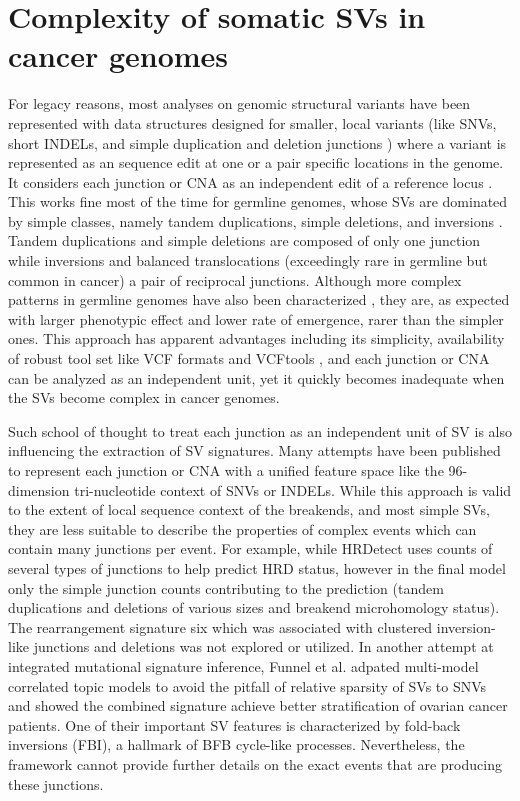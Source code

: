 \documentclass[phd,tocprelim]{cornell}
\begin{document}
\section{Complexity of somatic SVs in cancer genomes}
For legacy reasons, most analyses on genomic structural variants have been represented with data structures designed for smaller, local variants (like SNVs, short INDELs, and simple duplication and deletion junctions \cite{Danecek2011-yi}) where a variant is represented as an sequence edit at one or a pair specific locations in the genome. It considers each junction or CNA as an independent edit of a reference locus \cite{Li2008-su,Li2009-fv}. This works fine most of the time for germline genomes, whose SVs are dominated by simple classes, namely tandem duplications, simple deletions, and inversions \cite{Collins2020-iv}. Tandem duplications and simple deletions are composed of only one junction while inversions and balanced translocations (exceedingly rare in germline but common in cancer) a pair of reciprocal junctions. Although more complex patterns in germline genomes have also been characterized \cite{Carvalho2011-lb,Collins2020-iv}, they are, as expected with larger phenotypic effect and lower rate of emergence, rarer than the simpler ones. This approach has apparent advantages including its simplicity, availability of robust tool set like VCF formats and VCFtools \cite{Danecek2011-yi}, and each junction or CNA can be analyzed as an independent unit, yet it quickly becomes inadequate when the SVs become complex in cancer genomes.


Such school of thought to treat each junction as an independent unit of SV is also influencing the extraction of SV signatures. Many attempts have been published to represent each junction or CNA with a unified feature space like the 96-dimension tri-nucleotide context of SNVs or INDELs. While this approach is valid to the extent of local sequence context of the breakends, and most simple SVs, they are less suitable to describe the properties of complex events which can contain many junctions per event. For example, while HRDetect \cite{Davies:2017642} uses counts of several types of junctions to help predict HRD status, however in the final model only the simple junction counts contributing to the prediction (tandem duplications and deletions of various sizes and breakend microhomology status). The rearrangement signature six which was associated with clustered inversion-like junctions and deletions was not explored or utilized. In another attempt at integrated mutational signature inference, Funnel et al. \cite{Funnell2019-ti} adpated multi-model correlated topic models to avoid the pitfall of relative sparsity of SVs to SNVs and showed the combined signature achieve better stratification of ovarian cancer patients. One of their important SV features is characterized by fold-back inversions (FBI), a hallmark of BFB cycle-like processes. Nevertheless, the framework cannot provide further details on the exact events that are producing these junctions.
\end{document}
